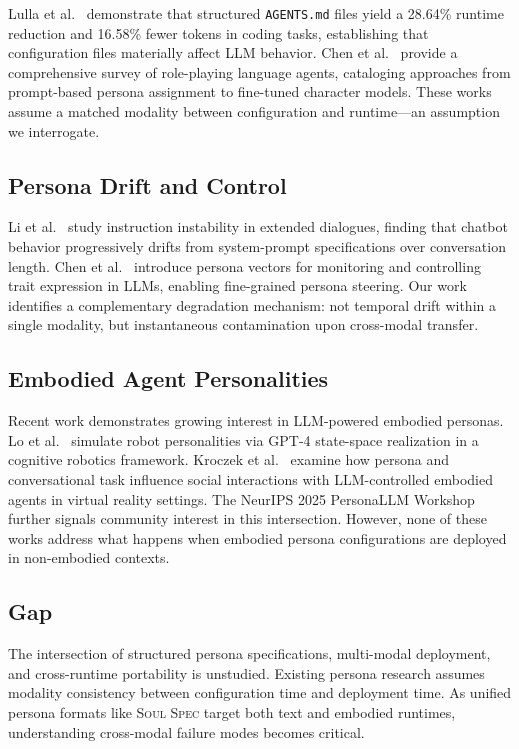 \documentclass[manuscript,screen,nonacm]{acmart}
\begin{document}
Lulla et al.~\cite{jai2025agents} demonstrate that structured \texttt{AGENTS.md} files yield a 28.64\% runtime reduction and 16.58\% fewer tokens in coding tasks, establishing that configuration files materially affect LLM behavior.
Chen et al.~\cite{chen2024persona_survey} provide a comprehensive survey of role-playing language agents, cataloging approaches from prompt-based persona assignment to fine-tuned character models.
These works assume a matched modality between configuration and runtime---an assumption we interrogate.

\subsection{Persona Drift and Control}

Li et al.~\cite{wang2024persona_drift} study instruction instability in extended dialogues, finding that chatbot behavior progressively drifts from system-prompt specifications over conversation length.
Chen et al.~\cite{park2025persona_vectors} introduce persona vectors for monitoring and controlling trait expression in LLMs, enabling fine-grained persona steering.
Our work identifies a complementary degradation mechanism: not temporal drift within a single modality, but instantaneous contamination upon cross-modal transfer.

\subsection{Embodied Agent Personalities}

Recent work demonstrates growing interest in LLM-powered embodied personas.
Lo et al.~\cite{robotpersonality2025} simulate robot personalities via GPT-4 state-space realization in a cognitive robotics framework.
Kroczek et al.~\cite{embodiedpersona2025} examine how persona and conversational task influence social interactions with LLM-controlled embodied agents in virtual reality settings.
The NeurIPS 2025 PersonaLLM Workshop~\cite{personallm_workshop2025} further signals community interest in this intersection.
However, none of these works address what happens when embodied persona configurations are deployed in non-embodied contexts.

\subsection{Gap}

The intersection of structured persona specifications, multi-modal deployment, and cross-runtime portability is unstudied.
Existing persona research assumes modality consistency between configuration time and deployment time.
As unified persona formats like \textsc{Soul Spec} target both text and embodied runtimes, understanding cross-modal failure modes becomes critical.
\end{document}
